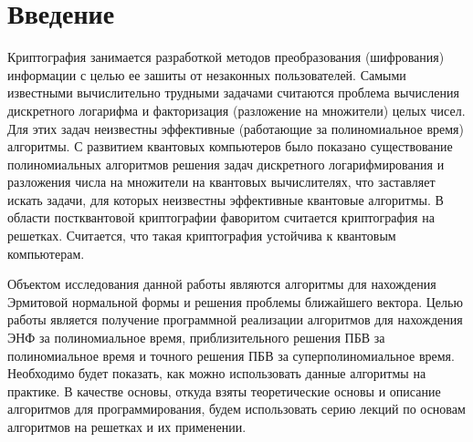 \newpage

\section{Введение}

Криптография занимается разработкой методов преобразования (шифрования) информации с целью ее зашиты от незаконных пользователей. Самыми известными вычислительно трудными задачами считаются проблема вычисления дискретного логарифма и факторизация (разложение на множители) целых чисел. Для этих задач неизвестны эффективные (работающие за полиномиальное время) алгоритмы. С развитием квантовых компьютеров было показано существование полиномиальных алгоритмов решения задач дискретного логарифмирования и разложения числа на множители на квантовых вычислителях, что заставляет искать задачи, для которых неизвестны эффективные квантовые алгоритмы. В области постквантовой криптографии фаворитом считается криптография на решетках. Считается, что такая криптография устойчива к квантовым компьютерам.

Объектом исследования данной работы являются алгоритмы для нахождения Эрмитовой нормальной формы и решения проблемы ближайшего вектора. Целью работы является получение программной реализации алгоритмов для нахождения ЭНФ за полиномиальное время, приблизительного решения ПБВ за полиномиальное время и точного решения ПБВ за суперполиномиальное время. Необходимо будет показать, как можно использовать данные алгоритмы на практике. В качестве основы, откуда взяты теоретические основы и описание алгоритмов для программирования, будем использовать серию лекций по основам алгоритмов на решетках и их применении.


\clearpage

